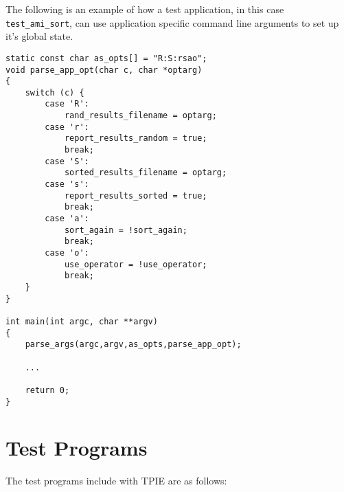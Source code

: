 The following is an example of how a test application, in this case
\verb|test_ami_sort|, can use application specific command line
arguments to set up it's global state.

\begin{verbatim}
static const char as_opts[] = "R:S:rsao";
void parse_app_opt(char c, char *optarg)
{
    switch (c) {
        case 'R':
            rand_results_filename = optarg;
        case 'r':
            report_results_random = true;
            break;
        case 'S':
            sorted_results_filename = optarg;
        case 's':
            report_results_sorted = true;
            break;
        case 'a':
            sort_again = !sort_again;
            break;
        case 'o':
            use_operator = !use_operator;
            break;
    }
}

int main(int argc, char **argv)
{
    parse_args(argc,argv,as_opts,parse_app_opt);

    ...

    return 0;
}
\end{verbatim}

\section{Test Programs}

The test programs include with TPIE are as follows:

